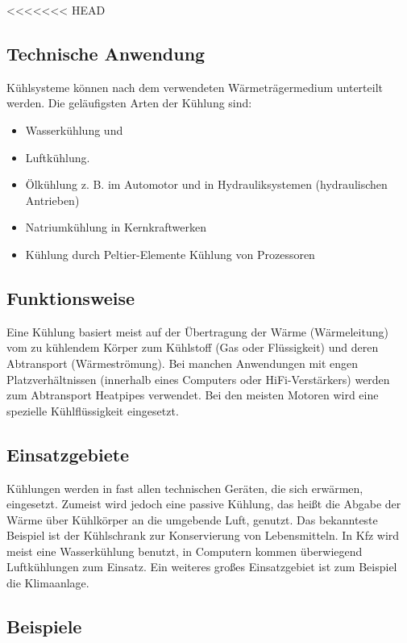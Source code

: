 <<<<<<< HEAD
\newpage

\subsection{Technische Anwendung}

Kühlsysteme können nach dem verwendeten Wärmeträgermedium unterteilt werden. Die geläufigsten Arten der Kühlung sind:

\begin{itemize}
	\item Wasserkühlung und
	\item Luftkühlung.
	\item Ölkühlung z.  B. im Automotor und in Hydrauliksystemen (hydraulischen Antrieben) 
	\item Natriumkühlung in Kernkraftwerken
	\item Kühlung durch Peltier-Elemente Kühlung von Prozessoren
\end{itemize}

\subsection{Funktionsweise}

Eine Kühlung basiert meist auf der Übertragung der Wärme (Wärmeleitung) vom zu kühlendem Körper zum Kühlstoff (Gas oder Flüssigkeit) und deren Abtransport (Wärmeströmung).
Bei manchen Anwendungen mit engen Platzverhältnissen (innerhalb eines Computers oder HiFi-Verstärkers) werden zum Abtransport Heatpipes verwendet.
Bei den meisten Motoren wird eine spezielle Kühlflüssigkeit eingesetzt.

\subsection{Einsatzgebiete}

Kühlungen werden in fast allen technischen Geräten, die sich erwärmen, eingesetzt. Zumeist wird jedoch eine passive Kühlung, das heißt die Abgabe der Wärme über Kühlkörper an die umgebende Luft, genutzt.
Das bekannteste Beispiel ist der Kühlschrank zur Konservierung von Lebensmitteln. In Kfz wird meist eine Wasserkühlung benutzt, in Computern kommen überwiegend Luftkühlungen zum Einsatz. Ein weiteres großes Einsatzgebiet ist zum Beispiel die Klimaanlage.

\subsection{Beispiele}

